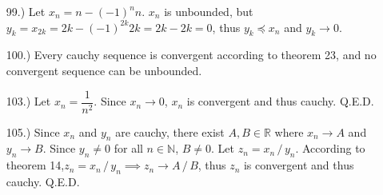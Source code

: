 \documentclass[12pt]{article}
\newcommand{\vertb}[1]{\left\vert#1\right\vert}
\newcommand{\e}{\varepsilon}
\newcommand{\di}{\,/\,}
\newcommand{\lm}[1]{\displaystyle\lim_{#1}}
\begin{document}
\begin{itemize}
    \item [99.)] Let $x_n=n-(-1)^nn$. $x_n$ is unbounded, but $y_k=x_{2k}=2k-(-1)^{2k}2k=2k-2k=0$, thus $y_k\preceq x_n$ and $y_k\to0$.

    \item [100.)] Every cauchy sequence is convergent according to theorem 23, and no convergent sequence can be unbounded.

    \item [103.)] Let $x_n=\dfrac{1}{n^2}$. Since $x_n\to0$, $x_n$ is convergent and thus cauchy. Q.E.D.

    \item [105.)] Since $x_n$ and $y_n$ are cauchy, there exist $A,B\in\mathbb{R}$ where $x_n\to A$ and $y_n\to B$. Since $y_n\ne0$ for all $n\in\mathbb{N}$, $B\ne0$. Let $z_n=x_n\di y_n$. According to theorem 14,\break $z_n=x_n\di y_n\implies z_n\to A\di B$, thus $z_n$ is convergent and thus cauchy. Q.E.D.
















\end{itemize}
\end{document}
